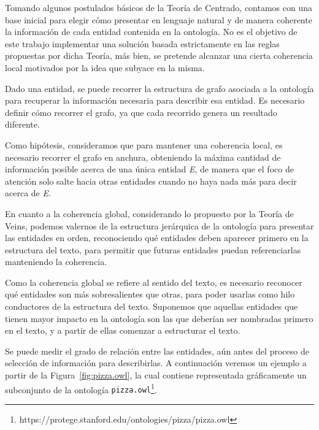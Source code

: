 Tomando algunos postulados básicos de la Teoría de Centrado, contamos con una base inicial para elegir cómo presentar en lenguaje natural y de manera coherente la información de cada entidad contenida en la ontología. No es el objetivo de este trabajo implementar una solución basada estrictamente en las reglas propuestas por dicha Teoría, más bien, se pretende alcanzar una cierta coherencia local motivados por la idea que subyace en la misma.


Dado una entidad, se puede recorrer la estructura de grafo asociada a la ontología para recuperar la información necesaria para describir esa entidad. Es necesario definir cómo recorrer el grafo, ya que cada recorrido genera un resultado diferente. 

Como hipótesis, consideramos que para mantener una coherencia local, es necesario recorrer el grafo en anchura, obteniendo la máxima cantidad de información posible acerca de una única entidad \emph{E}, de manera que el foco de atención solo salte hacia otras entidades cuando no haya nada más para decir acerca de \emph{E}.

En cuanto a la coherencia global, considerando lo propuesto por la Teoría de Veins, podemos valernos de la estructura jerárquica de la ontología para presentar las entidades en orden, reconociendo qué entidades deben aparecer primero en la estructura del texto, para permitir que futuras entidades puedan referenciarlas manteniendo la coherencia.

Como la coherencia global se refiere al sentido del texto, es necesario reconocer qué entidades son más sobresalientes que otras, para poder usarlas como hilo conductores de la estructura del texto. Suponemos que aquellas entidades que tienen mayor impacto en la ontología son las que deberían ser nombradas primero en el texto, y a partir de ellas comenzar a estructurar el texto.

Se puede medir el grado de relación entre las entidades, aún antes del proceso de selección de información para describirlas. A continuación veremos un ejemplo a partir de la Figura~\ref{fig:pizza.owl}, la cual contiene representada gráficamente un subconjunto de la ontología {\tt pizza.owl}\footnote{https://protege.stanford.edu/ontologies/pizza/pizza.owl}.

